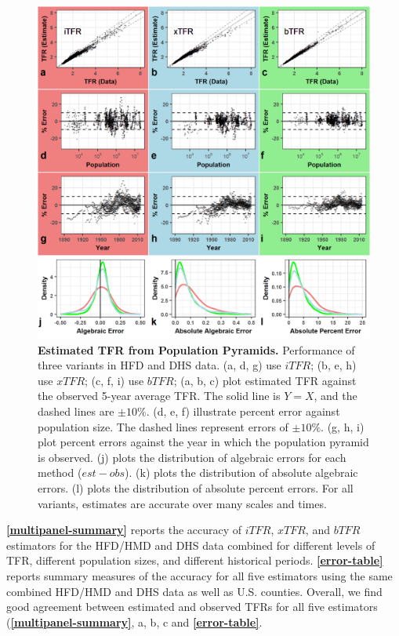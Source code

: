 \documentclass[12pt]{article}
\begin{document}
\begin{figure}
\centering
\includegraphics{manuscript_files/figure-latex/plot-multipanel-summary-1.png}
\caption{\textbf{Estimated TFR from Population Pyramids.} Performance of
three variants in HFD and DHS data. (a, d, g) use \(iTFR\); (b, e, h)
use \(xTFR\); (c, f, i) use \(bTFR\); (a, b, c) plot estimated TFR
against the observed 5-year average TFR. The solid line is \(Y=X\), and
the dashed lines are \(\pm 10\%\). (d, e, f) illustrate percent error
against population size. The dashed lines represent errors of
\(\pm 10\%\). (g, h, i) plot percent errors against the year in which
the population pyramid is observed. (j) plots the distribution of
algebraic errors for each method (\(est-obs\)). (k) plots the
distribution of absolute algebraic errors. (l) plots the distribution of
absolute percent errors. For all variants, estimates are accurate over
many scales and times. \label{multipanel-summary}}
\end{figure}

\textbf{\autoref{multipanel-summary}} reports the accuracy of \(iTFR\),
\(xTFR\), and \(bTFR\) estimators for the HFD/HMD and DHS data combined
for different levels of TFR, different population sizes, and different
historical periods. \textbf{\autoref{error-table}} reports summary
measures of the accuracy for all five estimators using the same combined
HFD/HMD and DHS data as well as U.S. counties. Overall, we find good
agreement between estimated and observed TFRs for all five estimators
(\textbf{\autoref{multipanel-summary}}, a, b, c and
\textbf{\autoref{error-table}}.
\end{document}

